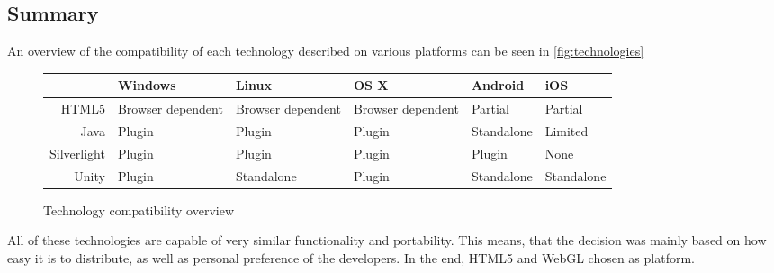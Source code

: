\subsection{Summary}

An overview of the compatibility of each technology described on various platforms can be seen in \autoref{fig:technologies}

\begin{figure}[ht]
\begin{tabular}{|r|p{1.7cm}|p{1.7cm}|p{1.7cm}|p{1.7cm}|p{1.7cm}|}
\hline
 & Windows & Linux & OS X & Android & iOS \\
\hline
HTML5 & Browser dependent & Browser dependent & Browser dependent & Partial & Partial \\
\hline
Java & Plugin & Plugin & Plugin & Standalone & Limited \\
\hline
Silverlight & Plugin & Plugin & Plugin & Plugin & None \\
\hline
Unity & Plugin & Standalone & Plugin & Standalone & Standalone\\
\hline
\end{tabular}
\caption{Technology compatibility overview}
\label{fig:technologies}
\end{figure}

All of these technologies are capable of very similar functionality and portability.
This means, that the decision was mainly based on how easy it is to distribute, as well as personal preference of the developers.
In the end, HTML5 and WebGL chosen as platform.